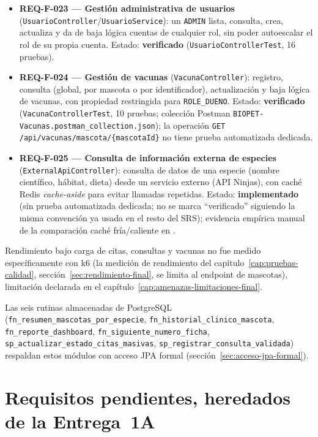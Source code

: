 \begin{itemize}[nosep]
  \item \textbf{REQ-F-023 --- Gesti\'on administrativa de usuarios}
    (\texttt{UsuarioController}/\texttt{UsuarioService}): un
    \texttt{ADMIN} lista, consulta, crea, actualiza y da de baja l\'ogica
    cuentas de cualquier rol, sin poder autoescalar el rol de su propia
    cuenta. Estado: \textbf{verificado} (\texttt{UsuarioControllerTest},
    16 pruebas).
  \item \textbf{REQ-F-024 --- Gesti\'on de vacunas} (\texttt{VacunaController}):
    registro, consulta (global, por mascota o por identificador),
    actualizaci\'on y baja l\'ogica de vacunas, con propiedad restringida
    para \texttt{ROLE\_DUENO}. Estado: \textbf{verificado}
    (\texttt{VacunaControllerTest}, 10 pruebas; colecci\'on Postman
    \texttt{BIOPET-Vacunas.postman\_collection.json}); la operaci\'on
    \texttt{GET /api/vacunas/mascota/\{mascotaId\}} no tiene prueba
    automatizada dedicada.
  \item \textbf{REQ-F-025 --- Consulta de informaci\'on externa de especies}
    (\texttt{ExternalApiController}): consulta de datos de una especie
    (nombre cient\'ifico, h\'abitat, dieta) desde un servicio externo (API
    Ninjas), con cach\'e Redis \emph{cache-aside} para evitar llamadas
    repetidas. Estado: \textbf{implementado} (sin prueba automatizada
    dedicada; no se marca ``verificado'' siguiendo la misma convenci\'on ya
    usada en el resto del SRS); evidencia emp\'irica manual de la
    comparaci\'on cach\'e fr\'ia/caliente en
    .
\end{itemize}

Rendimiento bajo carga de citas, consultas y vacunas no fue medido
espec\'ificamente con k6 (la medici\'on de rendimiento del
cap\'itulo~\ref{cap:pruebas-calidad}, secci\'on~\ref{sec:rendimiento-final},
se limita al endpoint de mascotas), limitaci\'on declarada en el
cap\'itulo~\ref{cap:amenazas-limitaciones-final}.

Las seis rutinas almacenadas de PostgreSQL (\texttt{fn\_resumen\_mascotas\_por\_especie},
\texttt{fn\_historial\_clinico\_mascota}, \texttt{fn\_reporte\_dashboard},
\texttt{fn\_siguiente\_numero\_ficha}, \texttt{sp\_actualizar\_estado\_citas\_masivas},
\texttt{sp\_registrar\_consulta\_validada}) respaldan estos m\'odulos con
acceso JPA formal (secci\'on~\ref{sec:acceso-jpa-formal}).

\section{Requisitos pendientes, heredados de la Entrega~1A}

